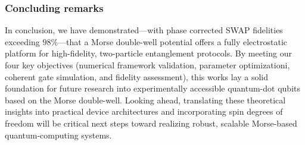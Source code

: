 \documentclass{subfiles}
\begin{document}
\subsubsection*{Concluding remarks}
In conclusion, we have demonstrated—with phase corrected SWAP fidelities exceeding $98\%$—that a Morse double-well potential offers a fully electrostatic platform for high-fidelity, two-particle entanglement protocols. By meeting our four key objectives (numerical framework validation, parameter optimizationi, coherent gate simulation, and fidelity assessment), this works lay a solid foundation for future research into experimentally accessible quantum-dot qubits based on the Morse double-well. Looking ahead, translating these theoretical insights into practical device architectures and incorporating spin degrees of freedom will be critical next steps toward realizing robust, scalable Morse-based quantum-computing systems.
\end{document}
